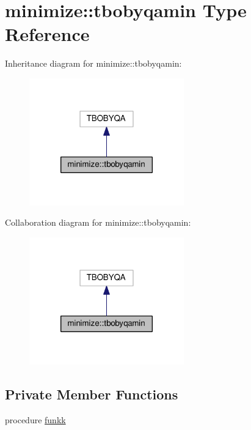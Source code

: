 \hypertarget{structminimize_1_1tbobyqamin}{}\section{minimize\+:\+:tbobyqamin Type Reference}
\label{structminimize_1_1tbobyqamin}


Inheritance diagram for minimize\+:\+:tbobyqamin\+:
\nopagebreak
\begin{figure}[H]
\begin{center}
\leavevmode
\includegraphics[width=190pt]{structminimize_1_1tbobyqamin__inherit__graph}
\end{center}
\end{figure}


Collaboration diagram for minimize\+:\+:tbobyqamin\+:
\nopagebreak
\begin{figure}[H]
\begin{center}
\leavevmode
\includegraphics[width=190pt]{structminimize_1_1tbobyqamin__coll__graph}
\end{center}
\end{figure}
\subsection*{Private Member Functions}
\begin{DoxyCompactItemize}
\item 
procedure \mbox{\hyperlink{structminimize_1_1tbobyqamin_ab1e5d7426942d9218b05cf91e0e8e337}{funkk}}
\end{DoxyCompactItemize}
